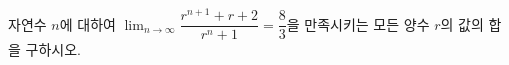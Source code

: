 자연수 $n$에 대하여 $\displaystyle\lim_{n\to\infty}\dfrac{r^{n+1}+r+2}{r^n+1}=\dfrac{8}{3}$을 만족시키는 모든 양수 $r$의 값의 합을 구하시오.
